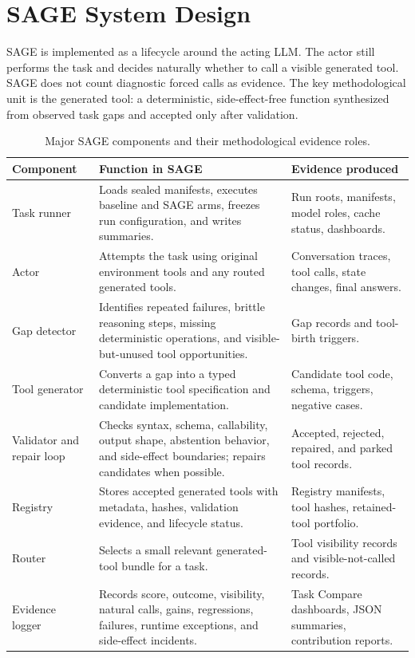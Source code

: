 \section{SAGE System Design}
\label{sec:sage_system_design}

SAGE is implemented as a lifecycle around the acting LLM. The actor still performs the task and decides naturally whether to call a visible generated tool. SAGE does not count diagnostic forced calls as evidence. The key methodological unit is the generated tool: a deterministic, side-effect-free function synthesized from observed task gaps and accepted only after validation.

\begin{table}[H]
\centering
\footnotesize
\begin{tabularx}{\textwidth}{p{3.1cm} X X}
\toprule
\textbf{Component} & \textbf{Function in SAGE} & \textbf{Evidence produced} \\
\midrule
Task runner & Loads sealed manifests, executes baseline and SAGE arms, freezes run configuration, and writes summaries. & Run roots, manifests, model roles, cache status, dashboards. \\
\addlinespace
Actor & Attempts the task using original environment tools and any routed generated tools. & Conversation traces, tool calls, state changes, final answers. \\
\addlinespace
Gap detector & Identifies repeated failures, brittle reasoning steps, missing deterministic operations, and visible-but-unused tool opportunities. & Gap records and tool-birth triggers. \\
\addlinespace
Tool generator & Converts a gap into a typed deterministic tool specification and candidate implementation. & Candidate tool code, schema, triggers, negative cases. \\
\addlinespace
Validator and repair loop & Checks syntax, schema, callability, output shape, abstention behavior, and side-effect boundaries; repairs candidates when possible. & Accepted, rejected, repaired, and parked tool records. \\
\addlinespace
Registry & Stores accepted generated tools with metadata, hashes, validation evidence, and lifecycle status. & Registry manifests, tool hashes, retained-tool portfolio. \\
\addlinespace
Router & Selects a small relevant generated-tool bundle for a task. & Tool visibility records and visible-not-called records. \\
\addlinespace
Evidence logger & Records score, outcome, visibility, natural calls, gains, regressions, failures, runtime exceptions, and side-effect incidents. & Task Compare dashboards, JSON summaries, contribution reports. \\
\bottomrule
\end{tabularx}
\caption{Major SAGE components and their methodological evidence roles.}
\label{tab:sage_components}
\end{table}

